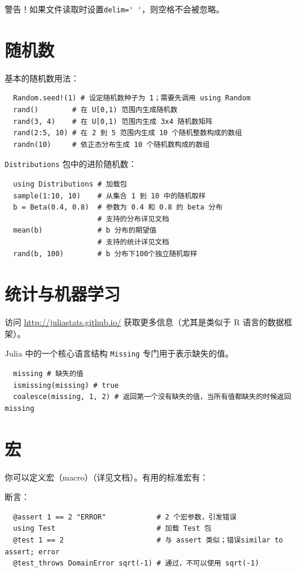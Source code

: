 \documentclass[10pt,a4paper]{article}
\begin{document}
警告！如果文件读取时设置\lstinline|delim=' '|，则空格不会被忽略。

\section{随机数}
基本的随机数用法：
\begin{lstlisting}
  Random.seed!(1) # 设定随机数种子为 1；需要先调用 using Random
  rand()        # 在 U[0,1) 范围内生成随机数
  rand(3, 4)    # 在 U[0,1) 范围内生成 3x4 随机数矩阵
  rand(2:5, 10) # 在 2 到 5 范围内生成 10 个随机整数构成的数组
  randn(10)     # 依正态分布生成 10 个随机数构成的数组
\end{lstlisting}

\lstinline|Distributions| 包中的进阶随机数：
\begin{lstlisting}
  using Distributions # 加载包
  sample(1:10, 10)    # 从集合 1 到 10 中的随机取样
  b = Beta(0.4, 0.8)  # 参数为 0.4 和 0.8 的 beta 分布
                      # 支持的分布详见文档
  mean(b)             # b 分布的期望值
                      # 支持的统计详见文档
  rand(b, 100)        # b 分布下100个独立随机取样
\end{lstlisting}

\section{统计与机器学习}
访问 \url{http://juliastats.github.io/} 获取更多信息（尤其是类似于 R 语言的数据框架）。

Julia 中的一个核心语言结构 \lstinline|Missing| 专门用于表示缺失的值。
\begin{lstlisting}
  missing # 缺失的值
  ismissing(missing) # true
  coalesce(missing, 1, 2) # 返回第一个没有缺失的值，当所有值都缺失的时候返回 missing
\end{lstlisting}

\section{宏}
你可以定义宏（macro）（详见文档）。有用的标准宏有：

断言：
\begin{lstlisting}
  @assert 1 == 2 "ERROR"            # 2 个宏参数，引发错误
  using Test                        # 加载 Test 包
  @test 1 == 2                      # 与 assert 类似；错误similar to assert; error
  @test_throws DomainError sqrt(-1) # 通过，不可以使用 sqrt(-1)
\end{lstlisting}
\end{document}
